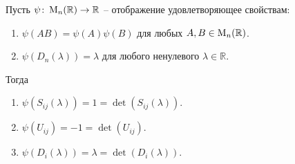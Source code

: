 \begin{claim}\label{claim::MultiOnElementary}
Пусть $\psi\colon \operatorname{M}_{n}(\mathbb R)\to \mathbb R$ -- отображение удовлетворяющее свойствам:
\begin{enumerate}
\item $\psi(AB) = \psi(A)\psi(B)$ для любых $A,B\in\operatorname{M}_{n}(\mathbb R)$.

\item $\psi(D_n(\lambda)) = \lambda$ для любого ненулевого $\lambda\in\mathbb R$.
\end{enumerate}
Тогда
\begin{enumerate}
\item $\psi(S_{ij}(\lambda)) = 1 = \det(S_{ij}(\lambda))$.
\item $\psi(U_{ij}) = -1 = \det(U_{ij})$.
\item $\psi(D_i(\lambda)) = \lambda = \det(D_i(\lambda))$.
\end{enumerate}
\end{claim}
